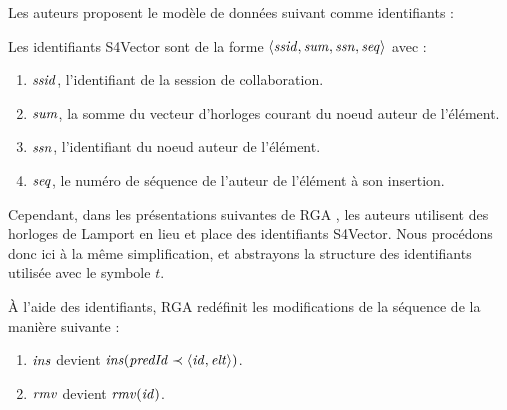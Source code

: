 Les auteurs proposent le modèle de données suivant comme identifiants :
\begin{definition}
  Les identifiants S4Vector sont de la forme $\langle \mathit{ssid},\mathit{sum},\mathit{ssn},\mathit{seq} \rangle$ avec :
  \begin{enumerate}[label=(\roman*)]
    \item $\mathit{ssid}$, l'identifiant de la session de collaboration.
    \item $\mathit{sum}$, la somme du vecteur d'horloges courant du noeud auteur de l'élément.
    \item $\mathit{ssn}$, l'identifiant du noeud auteur de l'élément.
    \item $\mathit{seq}$, le numéro de séquence de l'auteur de l'élément à son insertion.
  \end{enumerate}
\end{definition}
Cependant, dans les présentations suivantes de \ac{RGA} \cite{shapiro_2011_crdt, 2016-specification-complexity-collaborative-text-editing-attiya}, les auteurs utilisent des horloges de Lamport \cite{1978-happen-before-lamport} en lieu et place des identifiants S4Vector.
Nous procédons donc ici à la même simplification, et abstrayons la structure des identifiants utilisée avec le symbole $t$.

À l'aide des identifiants, \ac{RGA} redéfinit les modifications de la séquence de la manière suivante :
\begin{enumerate}[label=(\roman*)]
  \item $\mathit{ins}$ devient $\mathit{ins}(\mathit{predId} \prec \langle \mathit{id},\mathit{elt} \rangle)$.
  \item $\mathit{rmv}$ devient $\mathit{rmv}(\mathit{id})$.
\end{enumerate}

